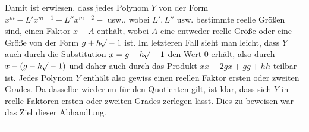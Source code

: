 Damit ist erwiesen, dass jedes Polynom $Y$ von der Form $x^m-L'x^{m-1}+L''x^{m-2}-$ usw., wobei $L',L''$ usw. bestimmte reelle Größen sind, einen Faktor $x-A$ enthält, wobei $A$ eine entweder reelle Größe oder eine Größe von der Form $g+h\mathord{{}^{}\!\surd}-1$ ist. Im letzteren Fall sieht man leicht, dass $Y$ auch durch die Substitution $x=g-h\mathord{{}^{}\!\surd}-1$ den Wert 0 erhält, also durch $x-(g-h\mathord{{}^{}\!\surd}-1)$ und daher auch durch das Produkt $xx-2gx+gg+hh$ teilbar ist. Jedes Polynom $Y$ enthält also gewiss einen reellen Faktor ersten oder zweiten Grades. Da dasselbe wiederum für den Quotienten gilt, ist klar, dass sich $Y$ in reelle Faktoren ersten oder zweiten Grades zerlegen lässt. Dies zu beweisen war das Ziel dieser Abhandlung.
\begin{center}\rule{3cm}{0.3pt}\end{center}
